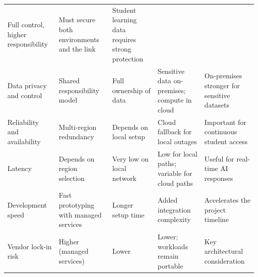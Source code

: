 \begin{table}[htb]
\begin{tabular}{L{0.13\textwidth} L{0.18\textwidth} L{0.18\textwidth} L{0.18\textwidth} L{0.185\textwidth}}
      Full control, higher responsibility &
      Must secure both environments and the link &
      Student learning data requires strong protection \\
    Data privacy and control &
      Shared responsibility model &
      Full ownership of data &
      Sensitive data on-premises; compute in cloud &
      On-premises stronger for sensitive datasets \\
    Reliability and availability &
      Multi-region redundancy &
      Depends on local setup &
      Cloud fallback for local outages &
      Important for continuous student access \\
    Latency &
      Depends on region selection &
      Very low on local network &
      Low for local paths; variable for cloud paths &
      Useful for real-time AI responses \\
    Development speed &
      Fast prototyping with managed services &
      Longer setup time &
      Added integration complexity &
      Accelerates the project timeline \\
    Vendor lock-in risk &
      Higher (managed services) &
      Lower &
      Lower; workloads remain portable &
      Key architectural consideration \\
    \hline
  \end{tabular}
\end{table}


